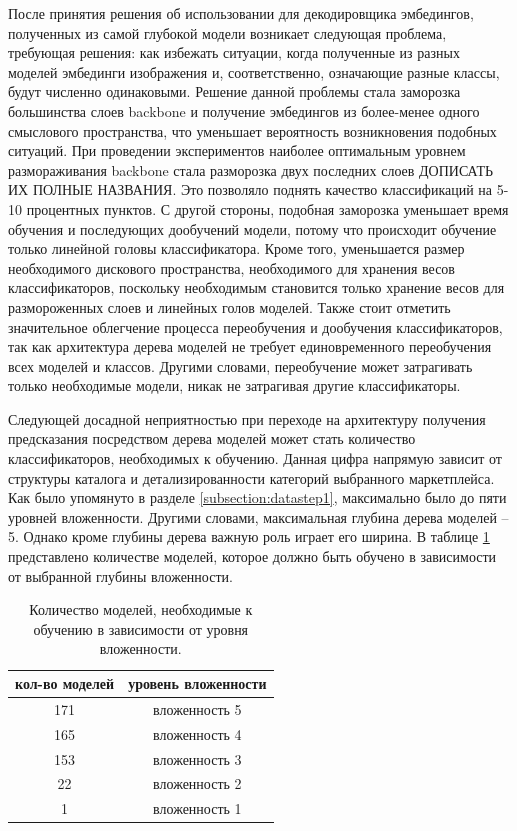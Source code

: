 \documentclass[a4paper,12pt]{extarticle}
\begin{document}
После принятия решения об использовании для декодировщика эмбедингов, полученных из самой глубокой модели возникает следующая проблема, требующая решения: как избежать ситуации, когда полученные из разных моделей эмбединги изображения и, соответственно, означающие разные классы, будут численно одинаковыми. Решение данной проблемы стала заморозка большинства слоев backbone и получение эмбедингов из более-менее одного смыслового пространства, что уменьшает вероятность возникновения подобных ситуаций. При проведении экспериментов наиболее оптимальным уровнем размораживания backbone стала разморозка двух последних слоев ДОПИСАТЬ ИХ ПОЛНЫЕ НАЗВАНИЯ. Это позволяло поднять качество классификаций на 5-10 процентных пунктов. С другой стороны, подобная заморозка уменьшает время обучения и последующих дообучений модели, потому что происходит обучение только линейной головы классификатора. Кроме того, уменьшается размер необходимого дискового пространства, необходимого для хранения весов классификаторов, поскольку необходимым становится только хранение весов для размороженных слоев и линейных голов моделей. Также стоит отметить значительное облегчение процесса переобучения и дообучения классификаторов, так как архитектура дерева моделей не требует единовременного переобучения всех моделей и классов. Другими словами, переобучение может затрагивать только необходимые модели, никак не затрагивая другие классификаторы.

Следующей досадной неприятностью при переходе на архитектуру получения предсказания посредством дерева моделей может стать количество классификаторов, необходимых к обучению. Данная цифра напрямую зависит от структуры каталога и детализированности категорий выбранного маркетплейса. Как было упомянуто в разделе \ref{subsection:datastep1}, максимально было до пяти уровней вложенности. Другими словами, максимальная глубина дерева моделей – 5. Однако кроме глубины дерева важную роль играет его ширина. В таблице \ref{table:amount-models} представлено количестве моделей, которое должно быть обучено в зависимости от выбранной глубины вложенности.

\begin{table}[ht]
	\caption{Количество моделей, необходимые к обучению в зависимости от уровня вложенности.}
	\label{table:amount-models}
	\footnotesize
	\centering
	\begin{tabular}{cc}
		\toprule
		\multicolumn{1}{c}{кол-во моделей} & \multicolumn{1}{c}{уровень вложенности}\\
		\midrule
		171 & вложенность 5\\
		165 & вложенность 4\\
		153 & вложенность 3\\
		22  & вложенность 2\\
		1   & вложенность 1\\
		\bottomrule
	\end{tabular}
\end{table}
\end{document}
